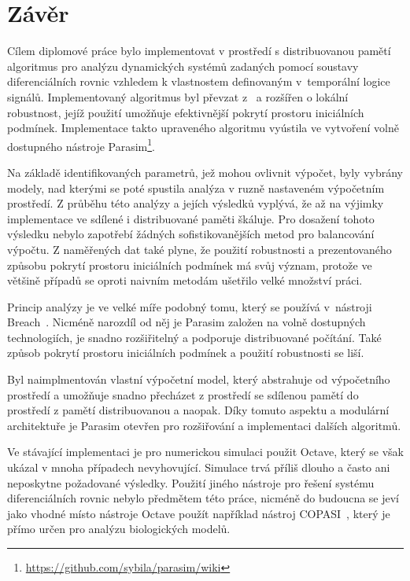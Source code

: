 \chapter{Závěr}\label{chapter:conclusion}

Cílem diplomové práce bylo implementovat v prostředí s distribuovanou pamětí
algoritmus pro analýzu dynamických systémů zadaných pomocí
soustavy diferenciálních rovnic vzhledem k vlastnostem definovaným
v~tem\-po\-rál\-ní logice signálů. Implementovaný algoritmus byl
převzat z~\cite{drazan2011} a rozšířen o lokální robustnost, jejíž použití umožňuje
efektivnější pokrytí prostoru iniciálních pod\-mí\-nek. 
Implementace takto upraveného algoritmu vyústila ve vytvoření volně dostupného nástroje Parasim\footnote{\url{https://github.com/sybila/parasim/wiki}}.

Na základě identifikovaných parametrů, jež mohou ovlivnit výpočet, byly vybrány modely,
nad kterými se poté spustila analýza v ruzně nastaveném výpočetním prostředí.
Z průběhu této analýzy a jejích výsledků vyplývá, že až na výjimky implementace
ve sdílené i distribuované paměti škáluje. Pro dosažení tohoto výsledku nebylo zapotřebí
žádných sofistikovanějších metod pro balancování výpočtu. Z naměřených
dat také plyne, že použití robustnosti a prezentovaného způsobu pokrytí prostoru iniciálních podmínek má svůj význam,
protože ve většině případů se oproti naivním metodám ušetřilo velké množství práci.

Princip analýzy je ve velké míře podobný tomu, který se používá v~nás\-tro\-ji Breach~\cite{donze2010breach}.
Nicméně narozdíl od něj je Parasim založen na volně dostupných technologiích, je snadno rozšiřitelný
a podporuje distribuované počítání. Také způsob pokrytí prostoru iniciálních podmínek
a použití robustnosti se liší.

Byl naimplmentován vlastní výpočetní model, který abstrahuje od vý\-po\-čet\-ního
prostředí a umožňuje snadno přecházet z prostředí se sdí\-le\-nou pamětí do prostředí z pamětí distribuovanou
a naopak. Díky tomuto a\-spek\-tu a modulární architektuře je Parasim otevřen pro rozšiřování a
implementaci dalších algoritmů.

Ve stávající implementaci je pro numerickou simulaci použit Octave, který se
však ukázal v mnoha případech nevyhovující. Simulace trvá příliš dlouho a často ani
neposkytne požadované výsledky. Použití jiného nástroje pro řešení systému
diferenciálních rovnic nebylo předmětem této práce, nicméně do budoucna se jeví jako vhodné
místo nástroje Octave použít například nástroj COPASI~\cite{hoops2006}, který je přímo určen
pro analýzu biologických modelů.

